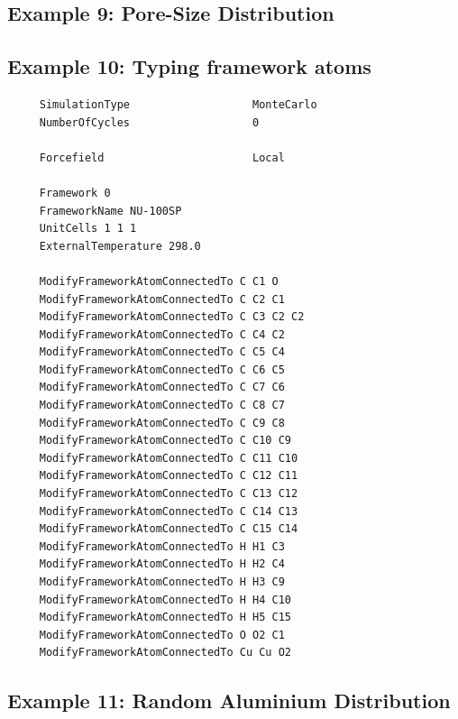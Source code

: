 \subsection*{Example 9: Pore-Size Distribution}

\subsection*{Example 10: Typing framework atoms}

\begin{tiny}
\begin{verbatim}
     SimulationType                   MonteCarlo
     NumberOfCycles                   0
     
     Forcefield                       Local
     
     Framework 0
     FrameworkName NU-100SP
     UnitCells 1 1 1
     ExternalTemperature 298.0
     
     ModifyFrameworkAtomConnectedTo C C1 O
     ModifyFrameworkAtomConnectedTo C C2 C1
     ModifyFrameworkAtomConnectedTo C C3 C2 C2
     ModifyFrameworkAtomConnectedTo C C4 C2
     ModifyFrameworkAtomConnectedTo C C5 C4
     ModifyFrameworkAtomConnectedTo C C6 C5
     ModifyFrameworkAtomConnectedTo C C7 C6
     ModifyFrameworkAtomConnectedTo C C8 C7
     ModifyFrameworkAtomConnectedTo C C9 C8
     ModifyFrameworkAtomConnectedTo C C10 C9
     ModifyFrameworkAtomConnectedTo C C11 C10
     ModifyFrameworkAtomConnectedTo C C12 C11
     ModifyFrameworkAtomConnectedTo C C13 C12
     ModifyFrameworkAtomConnectedTo C C14 C13
     ModifyFrameworkAtomConnectedTo C C15 C14
     ModifyFrameworkAtomConnectedTo H H1 C3
     ModifyFrameworkAtomConnectedTo H H2 C4
     ModifyFrameworkAtomConnectedTo H H3 C9
     ModifyFrameworkAtomConnectedTo H H4 C10
     ModifyFrameworkAtomConnectedTo H H5 C15
     ModifyFrameworkAtomConnectedTo O O2 C1
     ModifyFrameworkAtomConnectedTo Cu Cu O2
\end{verbatim}
\end{tiny}

\subsection*{Example 11: Random Aluminium Distribution}

